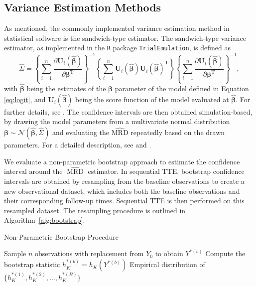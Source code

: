 \documentclass[pdflatex,sn-vancouver-ay]{sn-jnl}%
\theoremstyle{thmstyleone}%
\theoremstyle{thmstyletwo}%
\theoremstyle{thmstylethree}%
\newcommand{\Rlang}{\texttt{R}}
\newcommand{\RTTE}{\texttt{TrialEmulation}}
\begin{document}
\subsection{Variance Estimation Methods}\label{sec:VarMeth}
As mentioned, the commonly implemented variance estimation method in statistical software is the sandwich-type estimator.
The sandwich-type variance estimator, as implemented in the \Rlang{} package \RTTE{}, is defined as
\begin{equation}
\label{eq:sandwich}
    \hat{\Sigma} = \left\{\sum_{i=1}^n \frac{\partial \boldsymbol{U}_i(\hat{\boldsymbol{\beta}})}{\partial \boldsymbol{\beta}^{\mathrm{T}}}\right\}^{-1}\left\{\sum_{i=1}^n \boldsymbol{U}_i(\hat{\boldsymbol{\beta}}) \boldsymbol{U}_i(\hat{\boldsymbol{\beta}})^{\mathrm{T}}\right\}\left\{\sum_{i=1}^n \frac{\partial \boldsymbol{U}_i(\hat{\boldsymbol{\beta}})}{\partial \boldsymbol{\beta}^{\mathrm{T}}}\right\}^{-1},
\end{equation}
with $\hat{\boldsymbol{\beta}}$ being the estimates of the $\boldsymbol{\beta}$ parameter of the model defined in Equation \ref{eq:logit}, and $\boldsymbol{U}_i(\hat{\boldsymbol{\beta}})$ being the score function of the model evaluated at $\hat{\boldsymbol{\beta}}$. For further details, see \cite{linRobustInferenceCox1989}. The confidence intervals are then obtained simulation-based, by drawing the model parameters from a multivariate normal distribution $\boldsymbol{\beta} \sim \mathcal{N}(\hat{\boldsymbol{\beta}}, \hat{\Sigma})$ and evaluating the $\operatorname{\widehat{MRD}}$ repeatedly based on the drawn parameters. For a detailed description, see \cite{suTrialEmulationPackageEmulate2024} and \cite{mandelSimulationBasedConfidenceIntervals2013}. 

We evaluate a non-parametric bootstrap approach to estimate the confidence interval around the $\widehat{\operatorname{MRD}}$ estimator. In sequential TTE, bootstrap confidence intervals are obtained by resampling from the baseline observations to create a new observational dataset, which includes both the baseline observations and their corresponding follow-up times. Sequential TTE is then performed on this resampled dataset. The resampling procedure is outlined in Algorithm~\ref{alg:bootstrap}.

\begin{algorithm}
\caption{Non-Parametric Bootstrap Procedure \citep{carpenterBootstrapConfidenceIntervals2000a}}
\label{alg:bootstrap}
\begin{algorithmic}[1]
    \State Sample $n$ observations with replacement from $Y_0$ to obtain $Y^{*(b)}$
    \State Compute the bootstrap statistic $h_K^{*(b)} = h_K(Y^{*(b)})$
\EndFor
\State \Return Empirical distribution of $\{h_K^{*(1)}, h_K^{*(2)}, \dots, h_K^{*(B)}\}$
\end{algorithmic}
\end{algorithm}
\end{document}
